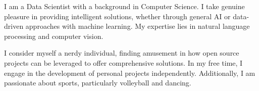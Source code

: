 

\begin{cvparagraph}


  \begin{justify}
  	

I am a Data Scientist with a background in Computer Science. I take genuine pleasure in providing intelligent solutions, whether through general AI or data-driven approaches with machine learning. My expertise lies in natural language processing and computer vision.

\noindent I consider myself a nerdy individual, finding amusement in how open source projects can be leveraged to offer comprehensive solutions. In my free time, I engage in the development of personal projects independently. Additionally, I am passionate about sports, particularly volleyball and dancing.
    

\end{justify}


\end{cvparagraph}
